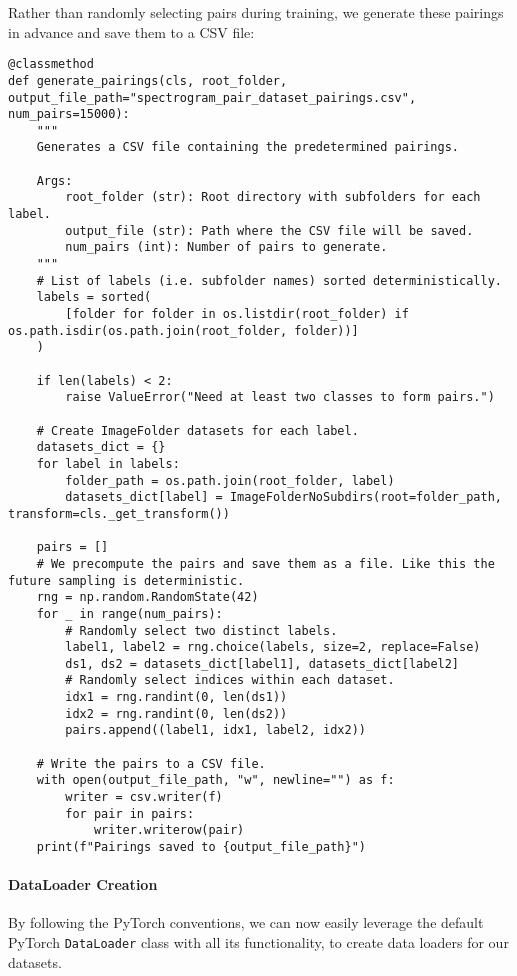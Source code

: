 Rather than randomly selecting pairs during training, we generate these pairings in advance and save them to a CSV file:

\begin{lstlisting}[caption={Generating predetermined pairs for consistency}]
@classmethod
def generate_pairings(cls, root_folder, output_file_path="spectrogram_pair_dataset_pairings.csv", num_pairs=15000):
    """
    Generates a CSV file containing the predetermined pairings.

    Args:
        root_folder (str): Root directory with subfolders for each label.
        output_file (str): Path where the CSV file will be saved.
        num_pairs (int): Number of pairs to generate.
    """
    # List of labels (i.e. subfolder names) sorted deterministically.
    labels = sorted(
        [folder for folder in os.listdir(root_folder) if os.path.isdir(os.path.join(root_folder, folder))]
    )

    if len(labels) < 2:
        raise ValueError("Need at least two classes to form pairs.")

    # Create ImageFolder datasets for each label.
    datasets_dict = {}
    for label in labels:
        folder_path = os.path.join(root_folder, label)
        datasets_dict[label] = ImageFolderNoSubdirs(root=folder_path, transform=cls._get_transform())

    pairs = []
    # We precompute the pairs and save them as a file. Like this the future sampling is deterministic.
    rng = np.random.RandomState(42)
    for _ in range(num_pairs):
        # Randomly select two distinct labels.
        label1, label2 = rng.choice(labels, size=2, replace=False)
        ds1, ds2 = datasets_dict[label1], datasets_dict[label2]
        # Randomly select indices within each dataset.
        idx1 = rng.randint(0, len(ds1))
        idx2 = rng.randint(0, len(ds2))
        pairs.append((label1, idx1, label2, idx2))

    # Write the pairs to a CSV file.
    with open(output_file_path, "w", newline="") as f:
        writer = csv.writer(f)
        for pair in pairs:
            writer.writerow(pair)
    print(f"Pairings saved to {output_file_path}")
\end{lstlisting}


\paragraph{DataLoader Creation}
By following the PyTorch conventions, we can now easily leverage the default PyTorch \texttt{DataLoader} class with all its functionality, to create data loaders for our datasets.


